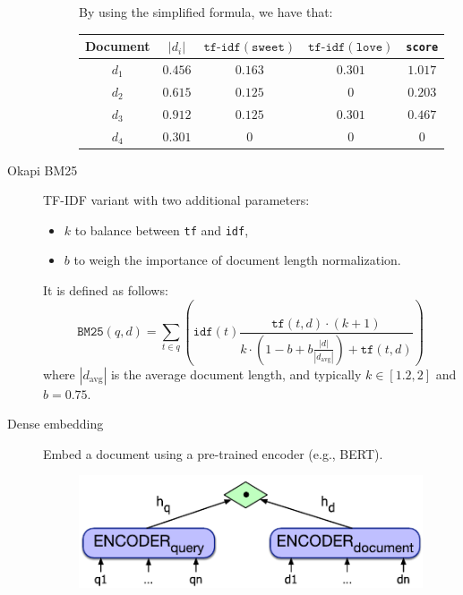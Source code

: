 \begin{description}
\begin{description}
\begin{example}
                    By using the simplified formula, we have that:
                    \begin{table}[H]
                        \centering
                        \footnotesize
                        \begin{tabular}{ccccc}
                            \toprule
                            \textbf{Document} & $|d_i|$ & $\texttt{tf-idf}(\texttt{sweet})$ & $\texttt{tf-idf}(\texttt{love})$ & \texttt{score} \\
                            \midrule
                            $d_1$ & $0.456$ & $0.163$ & $0.301$ & $1.017$ \\
                            $d_2$ & $0.615$ & $0.125$ & $0$ & $0.203$ \\
                            $d_3$ & $0.912$ & $0.125$ & $0.301$ & $0.467$ \\
                            $d_4$ & $0.301$ & $0$ & $0$ & $0$ \\
                            \bottomrule
                        \end{tabular}
                    \end{table}
                \end{example}
        \end{description}


    \item[Okapi BM25] 
        TF-IDF variant with two additional parameters:
        \begin{itemize}
            \item $k$ to balance between \texttt{tf} and \texttt{idf},
            \item $b$ to weigh the importance of document length normalization.
        \end{itemize} 
        It is defined as follows:
        \[ 
            \texttt{BM25}(q, d) = 
                \sum_{t \in q} \left( \texttt{idf}(t) \frac{\texttt{tf}(t, d) \cdot (k+1)}{k \cdot \left( 1 - b + b \frac{|d|}{|d_\text{avg}|} \right) + \texttt{tf}(t, d)} \right)
        \]
        where $|d_\text{avg}|$ is the average document length, and typically $k \in [1.2, 2]$ and $b = 0.75$.


    \item[Dense embedding] 
        Embed a document using a pre-trained encoder (e.g., BERT).

        \begin{figure}[H]
            \centering
            \includegraphics[width=0.45\linewidth]{./img/_info_retrieval_dense_embedding.pdf}
        \end{figure}


\end{description}

